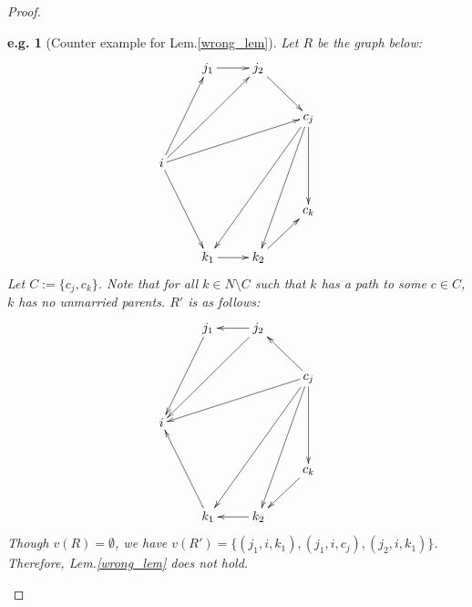 \documentclass[11pt,a4paper,dvipdfmx]{article}
\theoremstyle{plain}
\newtheorem{eg}{e.g.}[section]
\begin{document}
\begin{proof}
	\begin{screen}
	\begin{eg}[Counter example for Lem.\ref{wrong_lem}]
		Let $R$ be the graph below:
		\[
		\xymatrix{
			  & j_1 \ar[r] & j_2 \ar[rd]  &  \\
			  & & & c_j \ar[dd] \ar[llddd] \ar[lddd] \\
			i \ar[ruu] \ar[rruu] \ar[rrru] \ar[rdd] & & & \\
			& & & c_k\\
			& k_1 \ar[r] & k_2 \ar[ru] & 
		}
		\]
		Let $C := \{c_j, c_k\}$. Note that for all $k \in N \setminus C$ such that $k$ has a path to some $c \in C$, $k$ has no unmarried parents. $R'$ is as follows:
		\[
		\xymatrix{
			  & j_1 \ar[ldd] & j_2 \ar[l] \ar[lldd] &  \\
			  & & & c_j \ar[dd] \ar[llddd] \ar[lddd] \ar[llld] \ar[lu] \\
			i  & & & \\
			& & & c_k \ar[ld] \\
			& k_1 \ar[luu] & k_2 \ar[l] & 
		}
		\]
		Though $v(R) = \emptyset$, we have $v(R') = \{(j_1, i, k_1), (j_1, i, c_j), (j_2, i, k_1)\}$. Therefore, Lem.\ref{wrong_lem} does not hold.
	\end{eg}
	\end{screen}	
\end{proof}



\newpage
\end{document}
